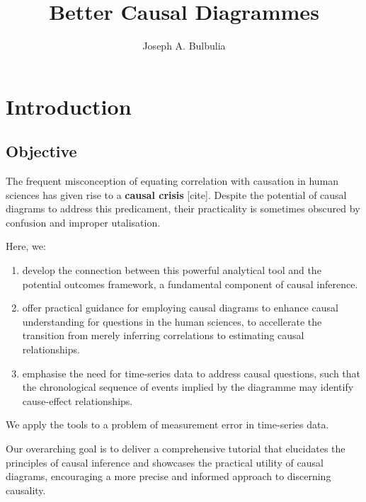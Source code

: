 \documentclass[
  singlecolumn]{report}
\title{Better Causal Diagrammes}
\author{Joseph A. Bulbulia}
\date{}
\begin{document}
\maketitle
\ifdefined\Shaded\renewenvironment{Shaded}{\begin{tcolorbox}[sharp corners, breakable, frame hidden, borderline west={3pt}{0pt}{shadecolor}, boxrule=0pt, interior hidden, enhanced]}{\end{tcolorbox}}\fi

\listoffigures
\listoftables
\hypertarget{introduction}{%
\section{Introduction}\label{introduction}}

\hypertarget{objective}{%
\subsection{Objective}\label{objective}}

The frequent misconception of equating correlation with causation in
human sciences has given rise to a \textbf{causal crisis} {[}cite{]}.
Despite the potential of causal diagrams to address this predicament,
their practicality is sometimes obscured by confusion and improper
utalisation.

Here, we:

\begin{enumerate}
\def\labelenumi{\arabic{enumi}.}
\item
  develop the connection between this powerful analytical tool and the
  potential outcomes framework, a fundamental component of causal
  inference.
\item
  offer practical guidance for employing causal diagrams to enhance
  causal understanding for questions in the human sciences, to
  accellerate the transition from merely inferring correlations to
  estimating causal relationships.
\item
  emphasise the need for time-series data to address causal questions,
  such that the chronological sequence of events implied by the
  diagramme may identify cause-effect relationships.
\end{enumerate}

We apply the tools to a problem of measurement error in time-series
data.

Our overarching goal is to deliver a comprehensive tutorial that
elucidates the principles of causal inference and showcases the
practical utility of causal diagrams, encouraging a more precise and
informed approach to discerning causality.
\end{document}
